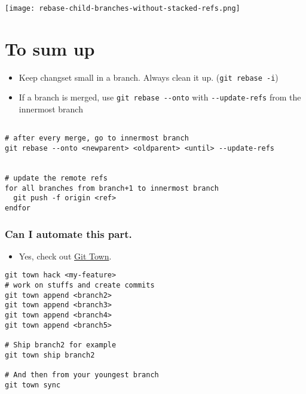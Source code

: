 \documentclass[11pt]{article}
\begin{document}
\begin{center}
\texttt{[image: rebase-child-branches-without-stacked-refs.png]}
\label{orgc2b4497}
\end{center}
\section{To sum up}
\label{sec:org7e16779}

\begin{itemize}
\item Keep changset small in a branch. Always clean it up. (\texttt{git rebase -i})
\item If a branch is merged, use \texttt{git rebase -{}-{}onto} with \texttt{-{}-{}update-refs} from the innermost branch
\end{itemize}

\begin{verbatim}

# after every merge, go to innermost branch
git rebase --onto <newparent> <oldparent> <until> --update-refs


# update the remote refs
for all branches from branch+1 to innermost branch
  git push -f origin <ref>
endfor
\end{verbatim}
\subsubsection{Can I automate this part.}
\label{sec:orgc9e9501}
\begin{itemize}
\item Yes, check out \href{https://www.git-town.com/}{Git Town}.
\end{itemize}
\begin{verbatim}
git town hack <my-feature>
# work on stuffs and create commits
git town append <branch2>
git town append <branch3>
git town append <branch4>
git town append <branch5>

# Ship branch2 for example
git town ship branch2

# And then from your youngest branch
git town sync
\end{verbatim}
\end{document}

